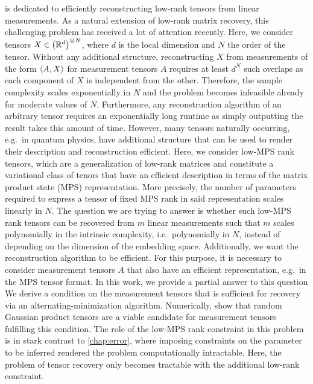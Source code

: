  is dedicated to efficiently reconstructing low-rank tensors from linear measurements.
As a natural extension of low-rank matrix recovery, this challenging problem has received a lot of attention recently.
Here, we consider tensors $X \in {\left({\mathbb{R}}^d\right)}^{\otimes N}$, where $d$ is the local dimension and $N$ the order of the tensor.
Without any additional structure, reconstructing $X$ from measurements of the form  $\braket{A, X}$ for measurement tensors $A$ requires at least $d^N$ such overlaps as each component of $X$ is independent from the other.
Therefore, the sample complexity scales exponentially in $N$ and the problem becomes infeasible already for moderate values of $N$.
Furthermore, any reconstruction algorithm of an arbitrary tensor requires an exponentially long runtime as simply outputting the result takes this amount of time.
However, many tensors naturally occurring, e.g.\ in quantum physics,  have additional structure that can be used to render their description and reconstruction efficient.
Here, we consider low-MPS rank tensors, which are a generalization of low-rank matrices and constitute a variational class of tenors that have an efficient description in terms of the matrix product state (MPS) representation.
More precisely, the number of parameters required to express a tensor of fixed MPS rank in said representation scales linearly in $N$.
The question we are trying to answer is whether such low-MPS rank tensors can be recovered from $m$ linear measurements such that $m$ scales polynomially in the intrinsic complexity, i.e.\ polynomially in $N$, instead of depending on the dimension of the embedding space.
Additionally, we want the reconstruction algorithm to be efficient.
For this purpose, it is necessary to consider measurement tensors $A$ that also have an efficient representation, e.g.\ in the MPS tensor format.
In this work, we provide a partial answer to this question
We derive a condition on the measurement tensors that is sufficient for recovery via an alternating-minimization algorithm.
Numerically, show that random Gaussian product tensors are a viable candidate for measurement tensors fulfilling this condition.
The role of the low-MPS rank constraint in this problem is in stark contrast to \cref{chap:error}, where imposing constraints on the parameter to be inferred rendered the problem computationally intractable.
Here, the problem of tensor recovery only becomes tractable with the additional low-rank constraint.
